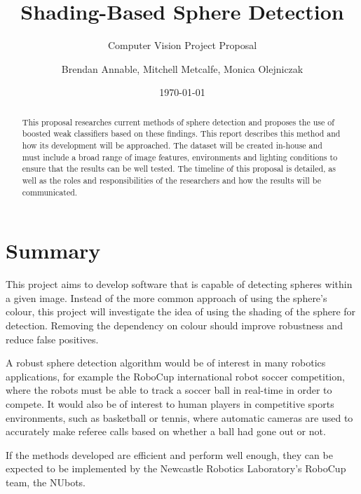 \documentclass[11pt]{scrartcl}
\title{Shading-Based Sphere Detection}
\subtitle{Computer Vision Project Proposal}
\author{Brendan Annable, Mitchell Metcalfe, Monica Olejniczak}
\date{\today}
\begin{document}
	\maketitle

	\begin{abstract}
		This proposal researches current methods of sphere detection and proposes 
		the use of boosted weak classifiers based on these findings. This report 
		describes this method and how its development will be approached. The
		dataset will be created in-house and must include a broad 
		range of image features, environments and lighting conditions to ensure
		that the results can be well tested. The timeline of this proposal is
		detailed, as well as the roles and responsibilities of the researchers
		and how the results will be communicated.
	\end{abstract}

	\newpage
	\tableofcontents
	\newpage

	\section{Summary} {
        
        This project aims to develop software that is capable of detecting spheres within a given image. Instead of the more common approach of using the sphere's colour, this project will investigate the idea of using the shading of the sphere for detection. Removing the dependency on colour should improve robustness and reduce false positives.
        
        A robust sphere detection algorithm would be of interest in many robotics applications, for example the RoboCup international robot soccer competition, where the robots must be able to track a soccer ball in real-time in order to compete. It would also be of interest to human players in competitive sports environments, such as basketball or tennis, where automatic cameras are used to accurately make referee calls based on whether a ball had gone out or not.
        
        If the methods developed are efficient and perform well enough, they can be expected to be implemented by the Newcastle Robotics Laboratory's RoboCup team, the NUbots.
		
	}
\end{document}
